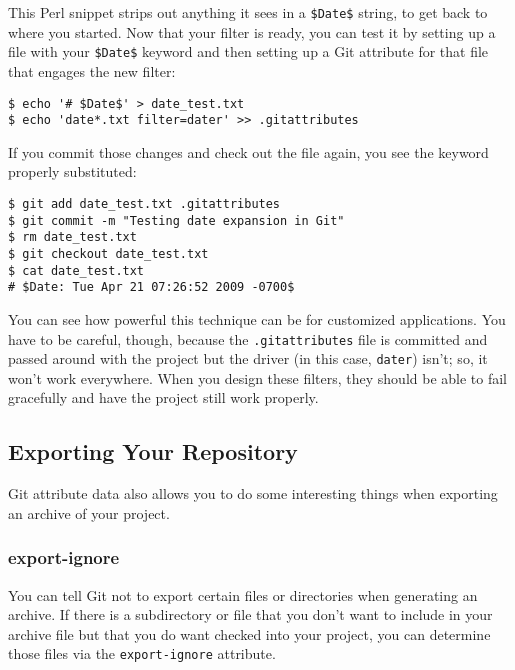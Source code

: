 \documentclass[a4paper]{book}
\begin{document}
This Perl snippet strips out anything it sees in a \texttt{\$Date\$} string, to get back to where you started. Now that your filter is ready, you can test it by setting up a file with your \texttt{\$Date\$} keyword and then setting up a Git attribute for that file that engages the new filter:

\begin{shaded}\begin{verbatim}
$ echo '# $Date$' > date_test.txt
$ echo 'date*.txt filter=dater' >> .gitattributes
\end{verbatim}\end{shaded}

If you commit those changes and check out the file again, you see the keyword properly substituted:

\begin{shaded}\begin{verbatim}
$ git add date_test.txt .gitattributes
$ git commit -m "Testing date expansion in Git"
$ rm date_test.txt
$ git checkout date_test.txt
$ cat date_test.txt
# $Date: Tue Apr 21 07:26:52 2009 -0700$
\end{verbatim}\end{shaded}

You can see how powerful this technique can be for customized applications. You have to be careful, though, because the \texttt{.gitattributes} file is committed and passed around with the project but the driver (in this case, \texttt{dater}) isn't; so, it won't work everywhere. When you design these filters, they should be able to fail gracefully and have the project still work properly.

\subsection{Exporting Your Repository}\label{exporting-your-repository}

Git attribute data also allows you to do some interesting things when exporting an archive of your project.

\subsubsection{export-ignore}

You can tell Git not to export certain files or directories when generating an archive. If there is a subdirectory or file that you don't want to include in your archive file but that you do want checked into your project, you can determine those files via the \texttt{export-ignore} attribute.
\end{document}
